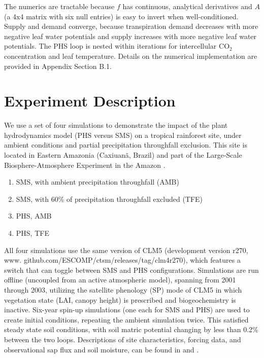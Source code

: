 \documentclass[draft,linenumbers]{agujournal}
\begin{document}
    The numerics are tractable because $f$ has continuous, analytical derivatives and $A$ (a 4x4 matrix with six null entries) is easy to invert when well-conditioned. Supply and demand converge, because transpiration demand decreases with more negative leaf water potentials and supply increases with more negative leaf water potentials. The PHS loop is nested within iterations for intercellular CO$_2$ concentration and leaf temperature. Details on the numerical implementation are provided in Appendix Section B.1.

 
\section{Experiment Description}
\label{sect:exp}

We use a set of four simulations to demonstrate the impact of the plant hydrodynamics model (PHS versus SMS) on a tropical rainforest site, under ambient conditions and partial precipitation throughfall exclusion.
This site is located in Eastern Amazonia (Caxiuan\~a, Brazil) and part of the Large-Scale Biosphere-Atmosphere Experiment in the Amazon \citep{avissar2002}.

\begin{enumerate}
\item SMS, with ambient precipitation throughfall (AMB)
\item SMS, with 60\% of precipitation throughfall excluded (TFE)
\item PHS, AMB
\item PHS, TFE
\end{enumerate}

All four simulations use the same version of CLM5
(development version r270, www. github.com/ESCOMP/ctsm/releases/tag/clm4\textunderscore r270),
which features a switch that can toggle between SMS and PHS configurations.
Simulations are run offline (uncoupled from an active atmospheric model), spanning from 2001 through 2003, utilizing the satellite phenology (SP) mode of CLM5 in which vegetation state (LAI, canopy height) is prescribed and biogeochemistry is inactive. Six-year spin-up simulations (one each for SMS and PHS) are used to create initial conditions, repeating the ambient simulation twice. This satisfied steady state soil conditions, with soil matric potential changing by less than 0.2\% between the two loops. Descriptions of site characteristics, forcing data, and observational sap flux and soil moisture, can be found in \cite{fisher2007} and \cite{fisher2008}.
\end{document}
